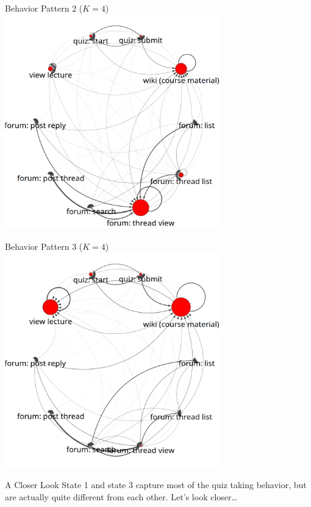\documentclass[10pt]{beamer}
\begin{document}
\begin{frame}{Behavior Pattern 2 ($K = 4$)}
  \centering
  \includegraphics[width=0.70\textwidth]{../figures/text-4state/state2.png}
\end{frame}

\begin{frame}{Behavior Pattern 3 ($K = 4$)}
  \centering
  \includegraphics[width=0.70\textwidth]{../figures/text-4state/state3.png}
\end{frame}

\begin{frame}{A Closer Look}
 State 1 and state 3 capture most of the quiz taking behavior, but are
 actually quite different from each other. Let's look closer\ldots
\end{frame}
\end{document}

